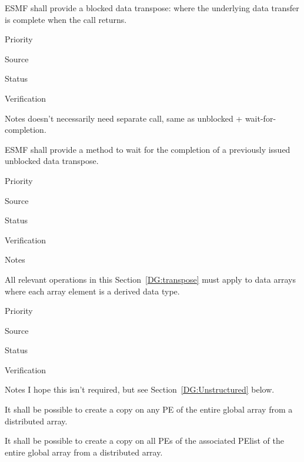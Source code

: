 
ESMF shall provide a blocked data transpose: where the underlying
data transfer is complete when the call returns.

\begin{reqlist}
\item[Priority]
\item[Source]
\item[Status]
\item[Verification]
\item[Notes] doesn't necessarily need separate call, same as unblocked
  + wait-for-completion.
\end{reqlist}


ESMF shall provide a method to wait for the completion of a previously
issued unblocked data transpose.

\begin{reqlist}
\item[Priority]
\item[Source]
\item[Status]
\item[Verification]
\item[Notes]
\end{reqlist}


All relevant operations in this Section~\ref{DG:transpose} must apply to
data arrays where each array element is a derived data type.

\begin{reqlist}
\item[Priority]
\item[Source]
\item[Status]
\item[Verification]
\item[Notes] I hope this isn't required, but see
  Section~\ref{DG:Unstructured} below.
\end{reqlist}


It shall be possible to create a copy on any PE of the entire global
array from a distributed array.


It shall be possible to create a copy on all PEs of the associated
PElist of the entire global array from a distributed array.

 \label{DG:PartGather}


